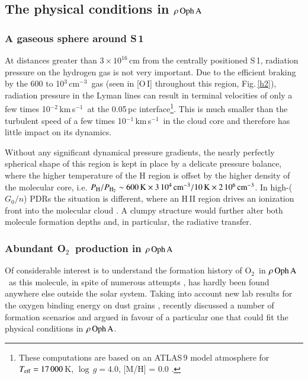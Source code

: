 \documentclass{aa}
\newcommand{\cmthree}{cm$^{-3}$}
\newcommand{\kms}{km\,s$^{-1}$}       %
\newcommand{\molo}{O$_{2}$}                     %
\newcommand{\powten}[1]{10$^{#1}$}
\newcommand{\roa}{$\rho \, {\rm Oph \, A}$}
\begin{document}
\subsection{The physical conditions in \roa}

\subsubsection{A gaseous sphere around S\,1}


At distances greater than $3 \times 10^{16}$\,cm from the centrally positioned S\,1, radiation pressure on the hydrogen gas is not very important. Due to the efficient braking by the 600 to \powten{3}\,\cmthree\ gas (seen in [O\,I] throughout this region, Fig.\,\ref{h2}), radiation pressure in the Lyman lines can result in terminal velocities of only a few times \powten{-2}\,\kms\ at the 0.05\,pc interface\footnote{These computations  are based on an ATLAS\,9 model atmosphere for $T_{\rm eff}= 17\,000$\,K, $\log\,g = 4.0$, [M/H] = 0.0 \citep{castelli2004}.}. This is much smaller than the turbulent speed of a few times \powten{-1}\,\kms\ in the cloud core and  therefore has   little impact on its dynamics.

Without any significant dynamical pressure gradients, the nearly perfectly spherical shape of this region is kept in place by a delicate pressure balance, where the higher temperature of the H region is offset by the higher density of the molecular core, i.e. $P_{\rm H} / P_{\rm H_2}  \sim  600\,{\rm K} \times 3\,10^4\,{\rm cm^{-3}} / 10\,{\rm K} \times 2\,10^6\,{\rm cm^{-3}}$.  In high-($G_0/n$) PDRs the situation is different, where an H\,II region drives an ionization front into the molecular cloud \citep[e.g.][]{tielens2005}. A clumpy structure would further alter both molecule formation depths and, in particular, the radiative transfer.  

\subsubsection{Abundant \molo\ production in \roa}

Of considerable interest is to understand the formation history of \molo\ in \roa\  as this molecule, in spite of numerous attempts \citep{goldsmith2000,goldsmith2002,pagani2003,yildiz2013,sandqvist2015,wirstrom2016}, has 
hardly been found anywhere else outside the solar system. Taking into account new lab results for the oxygen binding energy on dust grains \citep{he2015}, \citet{taquet2016} recently discussed a number of formation scenarios and argued in favour of a particular one that could fit the physical conditions in \roa.
\end{document}
